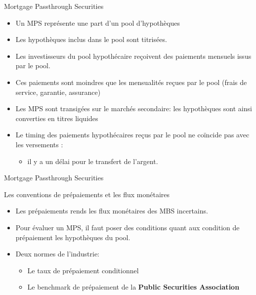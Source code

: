 \documentclass[10pt,a4paper]{beamer}
\begin{document}
\begin{frame}{Mortgage Passthrough Securities}
\begin{itemize}[label=\bullet]
\item Un MPS représente une part d’un pool d’hypothèques
\item Les hypothèques inclus dans le pool sont titrisées.
\item Les investisseurs du pool hypothécaire reçoivent des paiements mensuels issus par le pool.
\item Ces paiements sont moindres que les mensualités reçues par le pool (frais de service, garantie, assurance)
\item Les MPS sont transigées sur le marchés secondaire: les hypothèques sont ainsi converties en titres liquides
\item Le timing des paiements hypothécaires reçus par le pool ne coïncide pas avec les versements : 
\begin{itemize}[label=\bullet]
\item il y a un délai pour le transfert de l’argent.
\end{itemize}
\end{itemize}

\end{frame}

\begin{frame}{Mortgage Passthrough Securities}
\begin{block}{Les conventions de prépaiements et les flux monétaires}
\begin{itemize}[label=\bullet]
\item Les prépaiements rends les flux monétaires des MBS incertains.
\item Pour évaluer un MPS, il faut poser des conditions quant aux condition de prépaiement les hypothèques du pool.
\item Deux normes de l’industrie:
\begin{itemize}[label=\bullet]
\item Le taux de prépaiement conditionnel
\item Le benchmark de prépaiement de la \textbf{Public Securities Association}
\end{itemize}
\end{itemize}
\end{block}
\end{frame}
\end{document}

